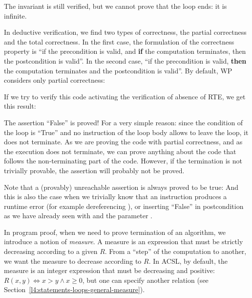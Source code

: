 The invariant is still verified, but we cannot prove that the loop ends:
it is infinite.



\label{l3:statements-loops-variant}


In deductive verification, we find two types of correctness, the partial
correctness and the total correctness. In the first case, the
formulation of the correctness property is ``if the precondition is
valid, and \textbf{if} the computation terminates, then the
postcondition is valid''. In the second case, ``if the precondition is
valid, \textbf{then} the computation terminates and the postcondition is
valid''. By default, WP considers only partial correctness:






If we try to verify this code activating the verification of absence of
RTE, we get this result:






The assertion ``False'' is proved! For a very simple reason: since the
condition of the loop is ``True'' and no instruction of the loop body
allows to leave the loop, it does not terminate. As we are proving the
code with partial correctness, and as the execution does not terminate,
we can prove anything about the code that follows the non-terminating
part of the code. However, if the termination is not trivially provable,
the assertion will probably not be proved.



\begin{Information}
  Note that a (provably) unreachable assertion is always proved to be true:
  And this is also the case when we trivially know that an instruction
  produces a runtime error (for example dereferencing ), or
  inserting ``False'' in postcondition as we have already seen with
   and the parameter .
\end{Information}


\label{l4:statements-loops-variant-measure}


In program proof, when we need to prove termination of an algorithm, we
introduce a notion of \textit{measure}. A measure is an expression that must be
strictly decreasing according to a given
$R$. From a ``step'' of the computation to another, we want the measure to
decrease according to $R$. In ACSL, by default, the measure is an integer
expression that must be decreasing and positive:
$R(x,y) \Leftrightarrow x > y \wedge x \geq 0$, but one can specify another
relation (see Section~\ref{l4:statements-loops-general-measure}).


